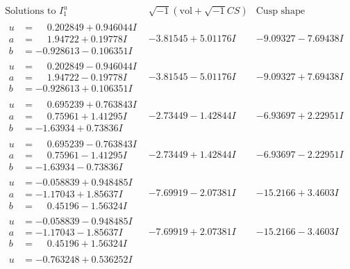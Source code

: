 \documentclass[1p]{elsarticle_modified}
\theoremstyle{definition}
\newcommand{\I}{\sqrt{-1}}
\begin{document}
$$\begin{array}{c|c|c}  
\text{Solutions to }I^u_{1}& \I (\text{vol} + \sqrt{-1}CS) & \text{Cusp shape}\\
 \hline 
\begin{aligned}
u &= \phantom{-}0.202849 + 0.946044 I \\
a &= \phantom{-}1.94722 + 0.19778 I \\
b &= -0.928613 - 0.106351 I\end{aligned}
 & -3.81545 + 5.01176 I & -9.09327 - 7.69438 I \\ \hline\begin{aligned}
u &= \phantom{-}0.202849 - 0.946044 I \\
a &= \phantom{-}1.94722 - 0.19778 I \\
b &= -0.928613 + 0.106351 I\end{aligned}
 & -3.81545 - 5.01176 I & -9.09327 + 7.69438 I \\ \hline\begin{aligned}
u &= \phantom{-}0.695239 + 0.763843 I \\
a &= \phantom{-}0.75961 + 1.41295 I \\
b &= -1.63934 + 0.73836 I\end{aligned}
 & -2.73449 - 1.42844 I & -6.93697 + 2.22951 I \\ \hline\begin{aligned}
u &= \phantom{-}0.695239 - 0.763843 I \\
a &= \phantom{-}0.75961 - 1.41295 I \\
b &= -1.63934 - 0.73836 I\end{aligned}
 & -2.73449 + 1.42844 I & -6.93697 - 2.22951 I \\ \hline\begin{aligned}
u &= -0.058839 + 0.948485 I \\
a &= -1.17043 + 1.85637 I \\
b &= \phantom{-}0.45196 - 1.56324 I\end{aligned}
 & -7.69919 - 2.07381 I & -15.2166 + 3.4603 I \\ \hline\begin{aligned}
u &= -0.058839 - 0.948485 I \\
a &= -1.17043 - 1.85637 I \\
b &= \phantom{-}0.45196 + 1.56324 I\end{aligned}
 & -7.69919 + 2.07381 I & -15.2166 - 3.4603 I \\ \hline\begin{aligned}
u &= -0.763248 + 0.536252 I \\

\end{aligned}
\end{array}$$
\end{document}
